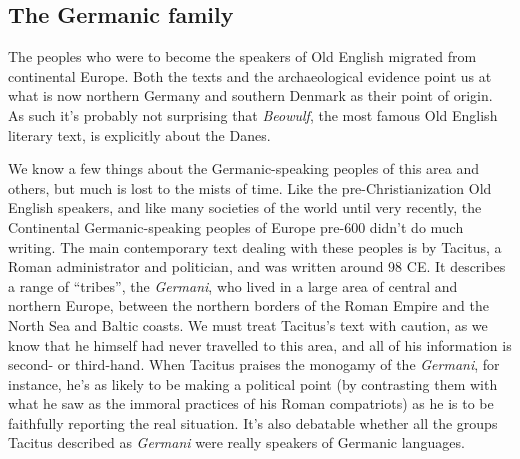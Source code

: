 \subsection{The Germanic family}
The peoples who were to become the speakers of Old English migrated from continental Europe. Both the texts and the archaeological evidence point us at what is now northern Germany and southern Denmark as their point of origin. As such it's probably not surprising that \emph{Beowulf}, the most famous Old English literary text, is explicitly about the Danes.

We know a few things about the Germanic-speaking peoples of this area and others, but much is lost to the mists of time. Like the pre-Christianization Old English speakers, and like many societies of the world until very recently, the Continental Germanic-speaking peoples of Europe pre-600 didn't do much writing. The main contemporary text dealing with these peoples is by Tacitus, a Roman administrator and politician, and was written around 98 CE. It describes a range of ``tribes'', the \emph{Germani}, who lived in a large area of central and northern Europe, between the northern borders of the Roman Empire and the North Sea and Baltic coasts. We must treat Tacitus's text with caution, as we know that he himself had never travelled to this area, and all of his information is second- or third-hand. When Tacitus praises the monogamy of the \emph{Germani}, for instance, he's as likely to be making a political point (by contrasting them with what he saw as the immoral practices of his Roman compatriots) as he is to be faithfully reporting the real situation. It's also debatable whether all the groups Tacitus described as \emph{Germani} were really speakers of Germanic languages.

